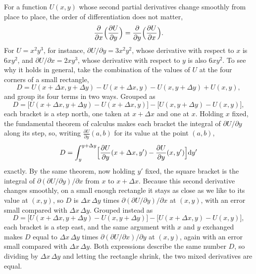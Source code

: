 \begin{toolbox}
For a function $U(x, y)$ whose second partial derivatives change smoothly
from place to place, the order of differentiation does not matter,
\begin{equation*}
   \frac{\partial}{\partial x}\Bigl(\frac{\partial U}{\partial y}\Bigr)
   = \frac{\partial}{\partial y}\Bigl(\frac{\partial U}{\partial x}\Bigr) .
\end{equation*}
For $U = x^2y^3$, for instance, $\partial U/\partial y = 3x^2y^2$, whose
derivative with respect to $x$ is $6xy^2$, and $\partial U/\partial x =
2xy^3$, whose derivative with respect to $y$ is also $6xy^2$. To see why
it holds in general, take the combination of the values of $U$ at the four
corners of a small rectangle,
\begin{equation*}
   D = U(x + \Delta x, y + \Delta y) - U(x + \Delta x, y)
   - U(x, y + \Delta y) + U(x, y) ,
\end{equation*}
and group its four terms in two ways. Grouped as
\begin{equation*}
   D = \bigl[U(x + \Delta x, y + \Delta y) - U(x + \Delta x, y)\bigr]
   - \bigl[U(x, y + \Delta y) - U(x, y)\bigr] ,
\end{equation*}
each bracket is a step north, one taken at $x + \Delta x$ and one at $x$.
Holding $x$ fixed, the fundamental theorem of calculus makes each bracket
the integral of $\partial U/\partial y$ along its step, so, writing
$\frac{\partial U}{\partial y}(a, b)$ for its value at the point $(a, b)$,
\begin{equation*}
   D = \int_y^{y + \Delta y}\Bigl[\frac{\partial U}{\partial y}(x + \Delta
   x, y') - \frac{\partial U}{\partial y}(x, y')\Bigr]\mathrm{d} y'
\end{equation*}
exactly. By the same theorem, now holding $y'$ fixed, the square bracket
is the integral of $\partial(\partial U/\partial y)/\partial x$ from $x$ to
$x + \Delta x$. Because this second derivative changes smoothly, on a
small enough rectangle it stays as close as we like to its value at $(x,
y)$, so $D$ is $\Delta x\,\Delta y$ times $\partial(\partial U/\partial
y)/\partial x$ at $(x, y)$, with an error small compared with $\Delta
x\,\Delta y$. Grouped instead as
\begin{equation*}
   D = \bigl[U(x + \Delta x, y + \Delta y) - U(x, y + \Delta y)\bigr]
   - \bigl[U(x + \Delta x, y) - U(x, y)\bigr] ,
\end{equation*}
each bracket is a step east, and the same argument with $x$ and $y$
exchanged makes $D$ equal to $\Delta x\,\Delta y$ times $\partial(\partial
U/\partial x)/\partial y$ at $(x, y)$, again with an error small compared
with $\Delta x\,\Delta y$. Both expressions describe the same number $D$,
so dividing by $\Delta x\,\Delta y$ and letting the rectangle shrink, the
two mixed derivatives are equal.
\end{toolbox}

